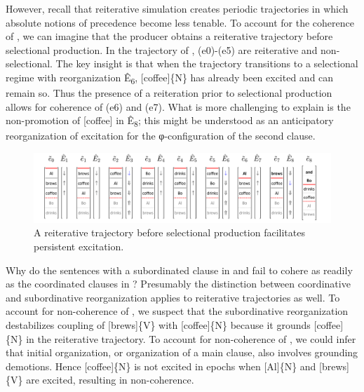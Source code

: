\ea\label{ex:7:7}
\label{ex:7:7a}
\label{ex:7:7b}
\label{ex:7:7c}
\z
\z

  However, recall that reiterative simulation creates periodic trajectories in which absolute notions of precedence become less tenable. To account for the coherence of , we can imagine that the producer obtains a reiterative trajectory before selectional production. In the trajectory of {}, (e0)-(e5) are reiterative and non-selectional. The key insight is that when the trajectory transitions to a selectional regime with reorganization Ê\textsubscript{6}, [coffee]\{N\} has already been excited and can remain so. Thus the presence of a reiteration prior to selectional production allows for coherence of (e6) and (e7). What is more challenging to explain is the non-promotion of [coffee] in Ê\textsubscript{8}; this might be understood as an anticipatory reorganization of excitation for the φ-configuration of the second clause.

  
\begin{figure}
\includegraphics[width=\textwidth]{figures/Tilsen-img150.png}
\caption{A reiterative trajectory before selectional production facilitates persistent excitation.}
\label{fig:7:6}
\end{figure}
 

  Why do the sentences with a subordinated clause in  and  fail to cohere as readily as the coordinated clauses in ? Presumably the distinction between coordinative and subordinative reorganization applies to reiterative trajectories as well. To account for non-coherence of , we suspect that the subordinative reorganization destabilizes coupling of [brews]\{V\} with [coffee]\{N\} because it grounds [coffee]\{N\} in the reiterative trajectory. To account for non-coherence of , we could infer that initial organization, or organization of a main clause, also involves grounding demotions. Hence [coffee]\{N\} is not excited in epochs when [Al]\{N\} and [brews]\{V\} are excited, resulting in non-coherence. 

